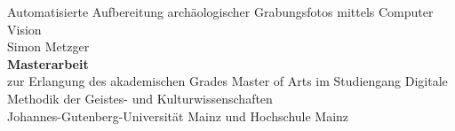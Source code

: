 \documentclass[a4paper,12pt,ngerman,titlepage]{article}
\begin{document}
\lstset{style=code}


\begin{titlepage}
    \begin{center}
        {\Huge Automatisierte Aufbereitung archäologischer Grabungsfotos mittels Computer Vision}\\
        \vspace{2cm}
        {\large Simon Metzger}\\
        \vspace{1cm}
        {\large{\textbf{ Masterarbeit}}}\\
        \vspace{1cm}
        {\large zur Erlangung des akademischen Grades Master of Arts im Studiengang Digitale Methodik der Geistes- und Kulturwissenschaften}\\
        \vspace{1cm}
        {\large Johannes-Gutenberg-Universität Mainz und Hochschule Mainz}
            
    \end{center}
\end{titlepage}
\newpage
\end{document}
